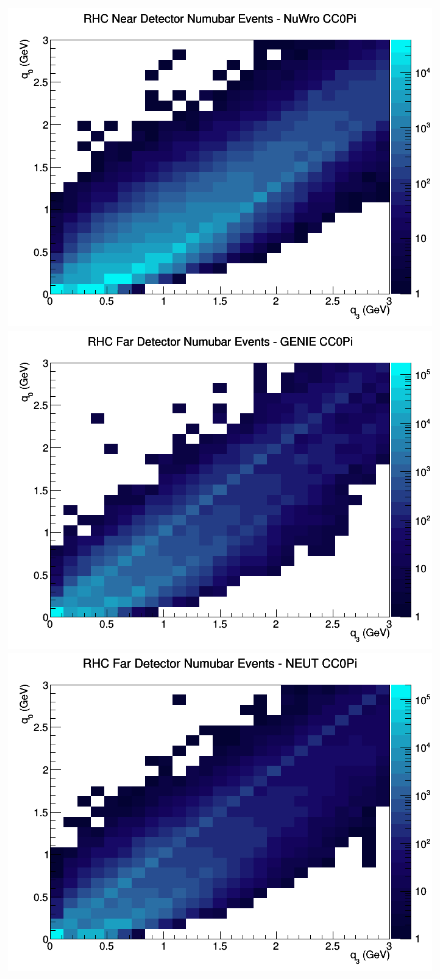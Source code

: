 \begin{figure}[h]
\includegraphics[width=\linewidth]{eff_q0_q3/LAr/CC0Pi_RHC_ND_numubar_q3_q0_NuWro.png}
\endminipage
\newline
{}
\includegraphics[width=\linewidth]{eff_q0_q3/LAr/CC0Pi_RHC_FD_numubar_q3_q0_GENIE.png}
\endminipage
{}
\includegraphics[width=\linewidth]{eff_q0_q3/LAr/CC0Pi_RHC_FD_numubar_q3_q0_NEUT.png}

\end{figure}
